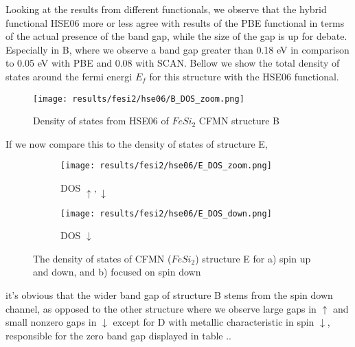 Looking at the results from different functionals, we observe that the hybrid functional HSE06 more or less agree with results of the PBE functional in terms of the actual presence of the band gap, while the size of the gap is up for debate. Especially in B, where we observe a band gap greater than 0.18 eV in comparison to 0.05 eV with PBE and 0.08 with SCAN. Bellow we show the total density of states around the fermi energi $E_f$ for this structure with the HSE06 functional. 

\begin{figure}[H]
\centering
\texttt{[image: results/fesi2/hse06/B\_DOS\_zoom.png]}
\caption{Density of states from HSE06 of $FeSi_2$ CFMN structure B}
\label{DOS_hse06_B}
\end{figure}

If we now compare this to the density of states of structure E,

\begin{figure}[H]
\begin{subfigure}{0.5\textwidth}
\texttt{[image: results/fesi2/hse06/E\_DOS\_zoom.png]}
\caption{DOS $\uparrow, \downarrow$}
\end{subfigure}
\hfill
\begin{subfigure}{0.5\textwidth}
\texttt{[image: results/fesi2/hse06/E\_DOS\_down.png]}
\caption{DOS $\downarrow$}
\end{subfigure}
\caption{The density of states of CFMN ($FeSi_2$) structure E for a) spin up and down, and b) focused on spin down}
\end{figure}

it's obvious that the wider band gap of structure B stems from the spin down channel, as opposed to the other structure where we observe large gaps in $\uparrow$ and small nonzero gaps in $\downarrow$ except for D with metallic characteristic in spin $\downarrow$, responsible for the zero band gap displayed in table ..

